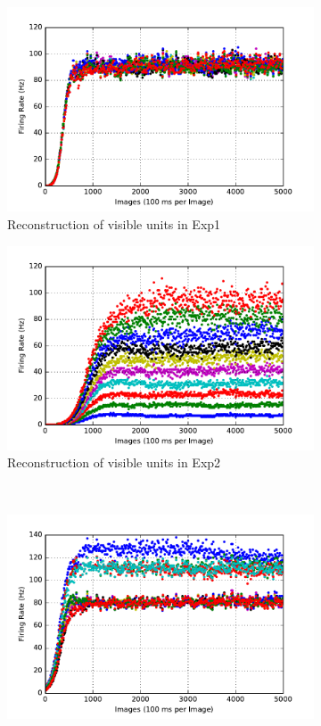 \begin{figure}
\begin{subfigure}[t]{0.4\textwidth}
		\includegraphics[width=\textwidth]{pics_sdlm/00_exp_SAE_Orig/exp1_recon_s.pdf}
		\caption{Reconstruction of visible units in Exp1}
	\end{subfigure}
	\begin{subfigure}[t]{0.4\textwidth}
		\includegraphics[width=\textwidth]{pics_sdlm/00_exp_SAE_Orig/exp2_recon_s.pdf}
		\caption{Reconstruction of visible units in Exp2}
	\end{subfigure}\\
	\begin{subfigure}[t]{0.4\textwidth}
		\includegraphics[width=\textwidth]{pics_sdlm/00_exp_SAE_Orig/exp1_hid_s.pdf}

\end{subfigure}
\end{figure}

